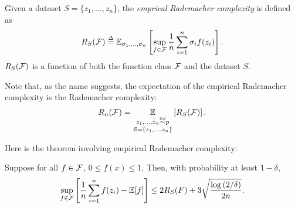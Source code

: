 \begin{definition}
Given a dataset $S = \{z_1, \dots, z_n\}$, the \textit{emprical Rademacher complexity} is defined as
\begin{equation}
R_S(\mathcal F) \overset{\Delta}{=} \mathbb E_{\sigma_1,\dots, \sigma_n} \left[ \sup_{f\in \mathcal F} \frac{1}{n} \sum^n_{i=1} \sigma_i f(z_i) \right].
\end{equation}
$R_S(\mathcal F)$ is a function of both the function class $\mathcal F$ and the dataset $S$.
\end{definition}

Note that, as the name suggests, the expectation of the empirical Rademacher complexity is the Rademacher complexity:
\begin{align}
    R_n(\mathcal F) = \underset{S=\{z_1,\dots, z_n\}}{\underset{z_1, \dots, z_n \overset{\textup{iid}}{\sim} p}{\mathbb E}}\left[ R_S(\mathcal F) \right].
\end{align}

Here is the theorem involving empirical Rademacher complexity:

\begin{theorem}\label{lec5:thm:thm2}
    Suppose for all $f \in \mathcal F$, $0 \leq f(x) \leq 1$. Then, with probability at least $1-\delta$,
    \begin{align}
        \sup_{f\in \mathcal F} \left[ \frac{1}{n} \sum^n_{i=1} f(z_i) - \mathbb E[f] \right] \leq 2 R_S(F) + 3\sqrt{\frac{\log{(2/\delta)}}{2n}}.
    \end{align}
\end{theorem}

